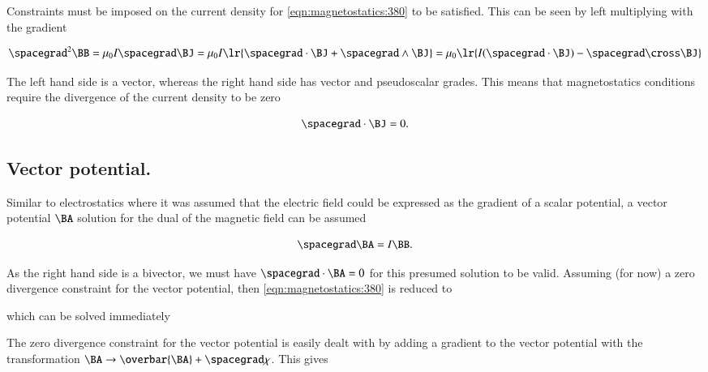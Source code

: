 Constraints must be imposed on the current density for \cref{eqn:magnetostatics:380} to be satisfied.
This can be seen by left multiplying with the gradient

\begin{dmath}\label{eqn:magnetostatics:440}
\spacegrad^2 \BB
= \mu_0 I \spacegrad \BJ
= \mu_0 I \lr{ \spacegrad \cdot \BJ + \spacegrad \wedge \BJ }
= \mu_0 \lr{ I (\spacegrad \cdot \BJ) - \spacegrad \cross \BJ }
\end{dmath}

The left hand side is a vector, whereas the right hand side has vector and pseudoscalar grades.
This means that magnetostatics conditions require the divergence of the current density to be zero

\begin{dmath}\label{eqn:magnetostatics:460}
\spacegrad \cdot \BJ = 0.
\end{dmath}

\subsection{Vector potential.}

Similar to electrostatics where it was assumed that the electric field could be expressed as the gradient of a scalar potential,
a vector potential \( \BA \) solution for the dual of the magnetic field can be assumed

\begin{dmath}\label{eqn:magnetostatics:480}
\spacegrad \BA = I \BB.
\end{dmath}

As the right hand side is a bivector, we must have \( \spacegrad \cdot \BA = 0 \) for this presumed solution to be valid.
Assuming (for now) a zero divergence constraint for the vector potential, then \cref{eqn:magnetostatics:380} is reduced to


which can be solved immediately


The zero divergence constraint for the vector potential is easily dealt with by adding a gradient to the vector potential with the
transformation \( \BA \rightarrow \overbar{\BA} + \spacegrad \chi \).
This gives

